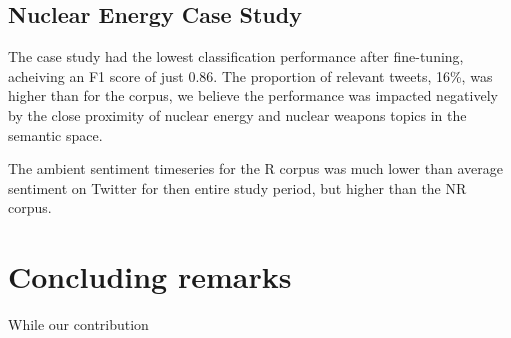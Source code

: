 
\subsection{ Nuclear Energy Case Study}
\todo{}
The  case study had the lowest classification performance after fine-tuning, 
acheiving an F1 score of just 0.86. 
The proportion of relevant tweets, 16\%, was higher than for the  corpus, 
we believe the performance was impacted negatively by the close proximity 
of nuclear energy and nuclear weapons topics in the semantic space. 

The ambient sentiment timeseries for the R  corpus was much lower than average sentiment on Twitter for then entire study period,
but higher than the NR corpus.

\section{Concluding remarks}
\label{sec:corpusCreation.concludingremarks}


While our contribution


